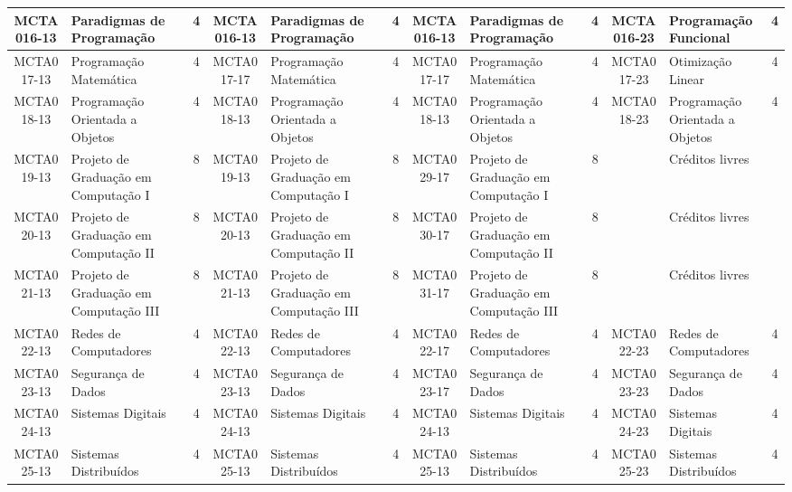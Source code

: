 \documentclass[a4paper]{article}
\begin{document}
\begin{landscape}
{\begin{longtable}{|c|p{.2\textheight}|c||c|p{.2\textheight}|c||c|p{.2\textheight}|c||c|p{.2\textheight}|c|}
    MCTA016-13 & Paradigmas de Programação & 4 &
    MCTA016-13 & Paradigmas de Programação & 4 & 
    MCTA016-13 & Paradigmas de Programação & 4 &
    MCTA016-23 & Programação Funcional & 4 \\ \hline

    MCTA017-13 & Programação Matemática & 4 &
    MCTA017-17 & Programação Matemática & 4 &
    MCTA017-17 & Programação Matemática & 4 &
    MCTA017-23 & Otimização Linear & 4 \\ \hline

    MCTA018-13 & Programação Orientada a Objetos & 4 &
    MCTA018-13 & Programação Orientada a Objetos & 4 & 
    MCTA018-13 & Programação Orientada a Objetos & 4 &
    MCTA018-23 & Programação Orientada a Objetos & 4 \\ \hline

    MCTA019-13 & Projeto de Graduação em Computação I & 8 &
    MCTA019-13 & Projeto de Graduação em Computação I & 8 &
    MCTA029-17 & Projeto de Graduação em Computação I & 8 &
               & Créditos livres &  \\ \hline

    MCTA020-13 & Projeto de Graduação em Computação II & 8 &
    MCTA020-13 & Projeto de Graduação em Computação II & 8 &
    MCTA030-17 & Projeto de Graduação em Computação II & 8 & 
               & Créditos livres &  \\ \hline

    MCTA021-13 & Projeto de Graduação em Computação III & 8 &
    MCTA021-13 & Projeto de Graduação em Computação III & 8 & 
    MCTA031-17 & Projeto de Graduação em Computação III & 8 &
               & Créditos livres &  \\ \hline

    MCTA022-13 & Redes de Computadores & 4 & 
    MCTA022-13 & Redes de Computadores & 4 &
    MCTA022-17 & Redes de Computadores & 4 & 
    MCTA022-23 & Redes de Computadores & 4 \\ \hline

    MCTA023-13 & Segurança de Dados & 4 & 
    MCTA023-13 & Segurança de Dados & 4 & 
    MCTA023-17 & Segurança de Dados & 4 & 
    MCTA023-23 & Segurança de Dados & 4 \\ \hline

    MCTA024-13 & Sistemas Digitais & 4 &
    MCTA024-13 & Sistemas Digitais & 4 &
    MCTA024-13 & Sistemas Digitais & 4 &
    MCTA024-23 & Sistemas Digitais & 4 \\ \hline

    MCTA025-13 & Sistemas Distribuídos & 4 &
    MCTA025-13 & Sistemas Distribuídos & 4 & 
    MCTA025-13 & Sistemas Distribuídos & 4 & 
    MCTA025-23 & Sistemas Distribuídos & 4 \\ \hline


\end{longtable}}
\end{landscape}
\end{document}
